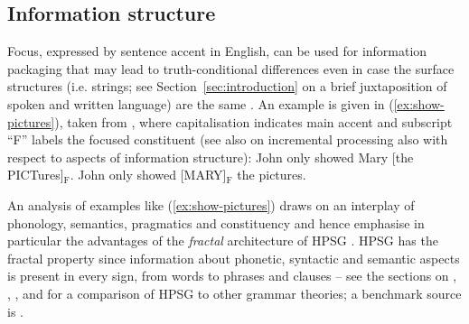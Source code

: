 \documentclass[output=paper]{langsci/langscibook}
\begin{document}
{  
\subsection{Information structure}
\label{sec:information-structure}

Focus, expressed by sentence accent in English, can be used for information packaging that may lead to truth-conditional differences  even in case the surface structures (i.e. strings; see Section~\ref{sec:introduction} on a brief juxtaposition of spoken and written language) are the same \citep{Halliday:1967}.
%
An example is given in (\ref{ex:show-pictures}), taken from \citet[]{Krifka:2008}, where capitalisation indicates main accent and subscript \enquote{F} labels the focused constituent (see also  on incremental processing also with respect to aspects of information structure):
%
\ea \label{ex:show-pictures}
  \ea John only showed Mary [the PICTures]$_\text{F}$.
  \ex John only showed [MARY]$_\text{F}$ the pictures.
  \z
\z


An analysis of examples like (\ref{ex:show-pictures}) draws on an interplay of phonology, semantics, pragmatics and constituency and hence emphasise in particular the advantages of the \emph{fractal} architecture   of HPSG \citep{Johnson:Lappin:1999}. 
%
HPSG has the fractal property since
information about phonetic, syntactic and semantic aspects is present in every sign, from words to phrases and clauses \citep[]{Pollard:1997} -- see the sections on , , ,  and  for a comparison of HPSG to other grammar theories; a benchmark source is \citealp{Mueller:2016}.


}
\end{document}
